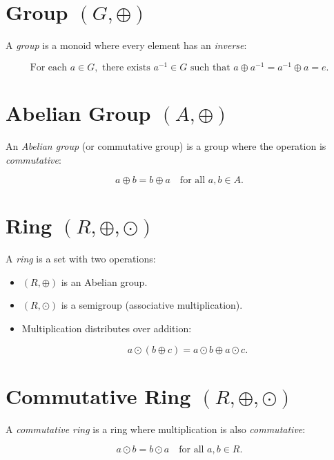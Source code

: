 \section{Group \texorpdfstring{\((G, \oplus)\)}{}}

A \emph{group} is a monoid where every element has an \emph{inverse}:

\[
    \text{For each } a \in G, \text{ there exists } a^{-1} \in G \text{ such that } a \oplus a^{-1} = a^{-1} \oplus a = e.
\]

\section{Abelian Group \texorpdfstring{\((A, \oplus)\)}{}}

An \emph{Abelian group} (or commutative group) is a group where the operation is \emph{commutative}:

\[
    a \oplus b = b \oplus a \quad \text{for all } a, b \in A.
\]

\section{Ring \texorpdfstring{\((R, \oplus, \odot)\)}{}}

A \emph{ring} is a set with two operations:

\begin{itemize}

    \item \((R, \oplus)\) is an Abelian group.

    \item \((R, \odot)\) is a semigroup (associative multiplication).
    
    \item Multiplication distributes over addition:
  
    \[
        a \odot (b \oplus c) = a \odot b \oplus a \odot c.
    \]

  \end{itemize}

\section{Commutative Ring \texorpdfstring{\((R, \oplus, \odot)\)}{}}

A \emph{commutative ring} is a ring where multiplication is also \emph{commutative}:

\[
    a \odot b = b \odot a \quad \text{for all } a, b \in R.
\]

